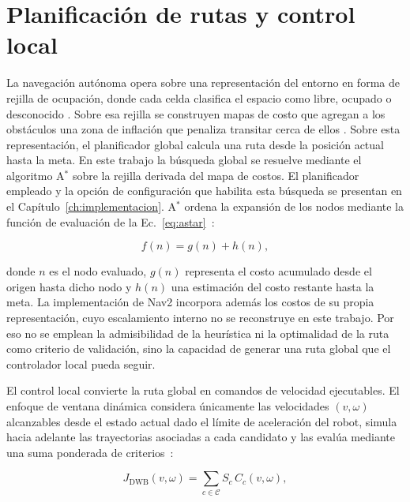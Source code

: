 \section{Planificación de rutas y control local}
\label{sec:nav_marco}

La navegación autónoma opera sobre una representación del entorno en forma de
rejilla de ocupación, donde cada celda clasifica el espacio como libre, ocupado
o desconocido \citep[Sec.~V]{macenski2023desks}. Sobre esa rejilla se construyen mapas de costo que agregan a los obstáculos una zona de inflación que penaliza
transitar cerca de ellos \citep{nav2_doc}. Sobre esta representación, el planificador global calcula una ruta desde la posición actual hasta la
meta. En este trabajo la búsqueda global se resuelve mediante el algoritmo A$^*$ sobre la rejilla derivada del mapa de costos. El planificador empleado y la opción de configuración que habilita esta búsqueda se presentan en el
Capítulo~\ref{ch:implementacion}. A$^*$ ordena la expansión de
los nodos mediante la función de evaluación de la Ec.~\eqref{eq:astar}~\citep[Sec.~2.2.2]{lavalle2006planning}:

\begin{equation}
f(n)=g(n)+h(n),
\label{eq:astar}
\end{equation}

\noindent donde $n$ es el nodo evaluado, $g(n)$ representa el costo acumulado
desde el origen hasta dicho nodo y $h(n)$ una estimación del costo restante
hasta la meta. La implementación de Nav2 incorpora además los costos de su propia representación, cuyo escalamiento interno no se reconstruye en este trabajo. Por eso no se emplean la admisibilidad de la heurística ni la optimalidad de la ruta como criterio de validación, sino la capacidad de generar una ruta global que el controlador local pueda seguir.

El control local convierte la ruta global en comandos de velocidad
ejecutables. El enfoque de ventana dinámica considera únicamente las
velocidades $(v,\omega)$ alcanzables desde el estado actual dado el límite
de aceleración del robot, simula hacia adelante las trayectorias asociadas a
cada candidato y las evalúa mediante una suma ponderada de criterios~\citep[Sec.~III-A]{macenski2023desks}:

\begin{equation}
J_{\mathrm{DWB}}(v,\omega)
=
\sum_{c\in\mathcal{C}}
S_c\,C_c(v,\omega),
\label{eq:costo_ctrl_local}
\end{equation}

